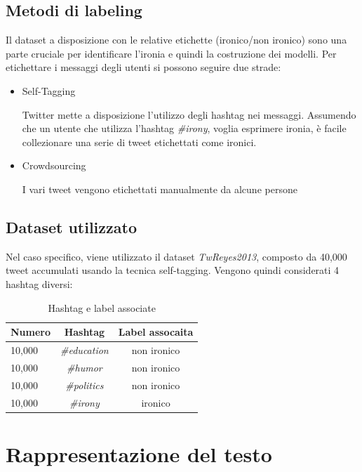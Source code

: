 \documentclass[oneside]{book}
\begin{document}
\subsection{Metodi di labeling}
Il dataset a disposizione con le relative etichette (ironico/non ironico) sono una parte cruciale per identificare l'ironia e quindi la costruzione dei modelli.
Per etichettare i messaggi degli utenti si possono seguire due strade:
\begin{itemize}
	\item Self-Tagging
	
	Twitter mette a disposizione l'utilizzo degli hashtag nei messaggi. Assumendo che un utente che utilizza l'hashtag \emph{\#irony}, voglia esprimere ironia, è facile collezionare una serie di tweet etichettati come ironici.
	
	
	\item Crowdsourcing
	
	I vari tweet vengono etichettati manualmente da alcune persone
	
	
	
	
\end{itemize}


\subsection{Dataset utilizzato}

Nel caso specifico, viene utilizzato il dataset \emph{TwReyes2013}, composto da 40,000 tweet accumulati usando la tecnica self-tagging. Vengono quindi considerati 4 hashtag diversi:


\begin{table}[ht]
	\centering
	\begin{tabular}[t]{lcc}
		\hline
		\textbf{Numero} & \textbf{Hashtag}  & \textbf{Label assocaita}\\
		\hline
		10,000 & \emph{\#education} & non ironico \\
		10,000 & \emph{\#humor}     & non ironico \\
		10,000 & \emph{\#politics}  & non ironico \\
		10,000 & \emph{\#irony}     & ironico     \\
		\hline
	\end{tabular}
	\caption{Hashtag e label associate}
\end{table}%



\section{Rappresentazione del testo}
\end{document}
